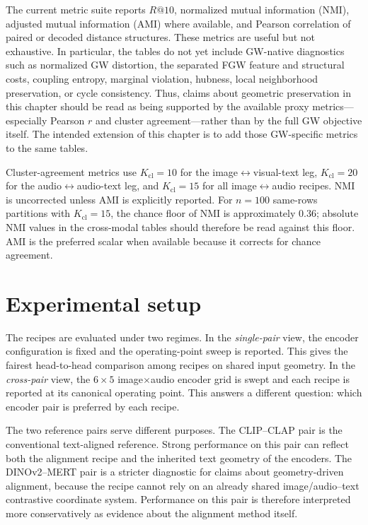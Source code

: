 The current metric suite reports $R@10$, normalized mutual information
(NMI), adjusted mutual information (AMI) where available, and Pearson
correlation of paired or decoded distance structures. These metrics are
useful but not exhaustive. In particular, the tables do not yet include
GW-native diagnostics such as normalized GW distortion, the separated
FGW feature and structural costs, coupling entropy, marginal violation,
hubness, local neighborhood preservation, or cycle consistency. Thus,
claims about geometric preservation in this chapter should be read as
being supported by the available proxy metrics---especially Pearson
$r$ and cluster agreement---rather than by the full GW objective itself.
The intended extension of this chapter is to add those GW-specific
metrics to the same tables.

Cluster-agreement metrics use $K_{\mathrm{cl}}=10$ for the
image$\leftrightarrow$visual-text leg, $K_{\mathrm{cl}}=20$ for the
audio$\leftrightarrow$audio-text leg, and $K_{\mathrm{cl}}=15$ for all
image$\leftrightarrow$audio recipes. NMI is uncorrected unless AMI is
explicitly reported. For $n=100$ same-rows partitions with
$K_{\mathrm{cl}}=15$, the chance floor of NMI is approximately $0.36$;
absolute NMI values in the cross-modal tables should therefore be read
against this floor. AMI is the preferred scalar when available because
it corrects for chance agreement.


\section{Experimental setup}
\label{sec:res-setup}

The recipes are evaluated under two regimes. In the \emph{single-pair}
view, the encoder configuration is fixed and the operating-point sweep
is reported. This gives the fairest head-to-head comparison among
recipes on shared input geometry. In the \emph{cross-pair} view, the
$6\times5$ image$\times$audio encoder grid is swept and each recipe is
reported at its canonical operating point. This answers a different
question: which encoder pair is preferred by each recipe.

The two reference pairs serve different purposes. The CLIP--CLAP pair
is the conventional text-aligned reference. Strong performance on this
pair can reflect both the alignment recipe and the inherited text
geometry of the encoders. The DINOv2--MERT pair is a stricter diagnostic
for claims about geometry-driven alignment, because the recipe cannot
rely on an already shared image/audio--text contrastive coordinate
system. Performance on this pair is therefore interpreted more
conservatively as evidence about the alignment method itself.

